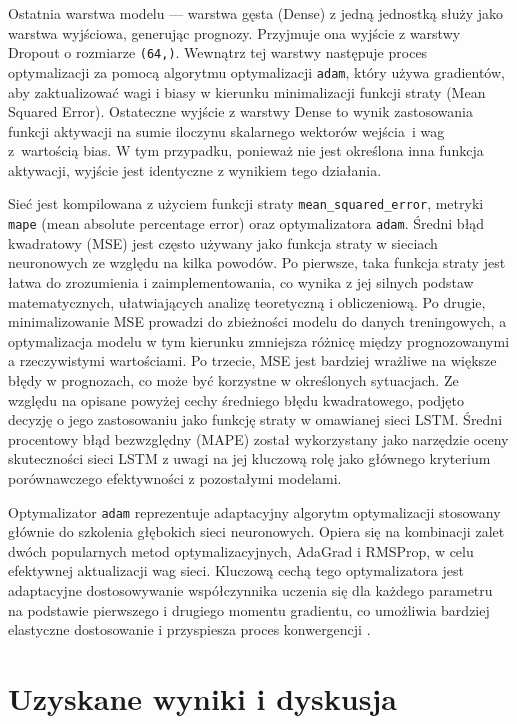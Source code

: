 \documentclass[polish, twoside, 12pt, a4paper]{article}
\theoremstyle{definition}
\theoremstyle{plain}
\theoremstyle{remark}
\newcommand{\code}[1]{\lstinline{#1}}
\begin{document}
Ostatnia warstwa modelu --- warstwa gęsta (Dense) z jedną jednostką służy jako warstwa wyjściowa, generując prognozy. Przyjmuje ona wyjście z warstwy Dropout o rozmiarze \code{(64,)}. Wewnątrz tej warstwy następuje proces optymalizacji za pomocą algorytmu optymalizacji \code{adam}, który używa gradientów, aby zaktualizować wagi i biasy w kierunku minimalizacji funkcji straty (Mean Squared Error). Ostateczne wyjście z warstwy Dense to wynik zastosowania funkcji aktywacji na sumie iloczynu skalarnego wektorów wejścia i wag z wartością bias. W tym przypadku, ponieważ nie jest określona inna funkcja aktywacji, wyjście jest identyczne z wynikiem tego działania.

Sieć jest kompilowana z użyciem funkcji straty \code{mean_squared_error}, metryki \code{mape} (mean absolute percentage error) oraz optymalizatora \code{adam}. Średni błąd kwadratowy (MSE) jest często używany jako funkcja straty w sieciach neuronowych ze względu na kilka powodów. Po pierwsze, taka funkcja straty jest łatwa do zrozumienia i zaimplementowania, co wynika z jej silnych podstaw matematycznych, ułatwiających analizę teoretyczną i obliczeniową. Po drugie, minimalizowanie MSE prowadzi do zbieżności modelu do danych treningowych, a optymalizacja modelu w tym kierunku zmniejsza różnicę między prognozowanymi a rzeczywistymi wartościami. Po trzecie, MSE jest bardziej wrażliwe na większe błędy w prognozach, co może być korzystne w określonych sytuacjach. Ze względu na opisane powyżej cechy średniego błędu kwadratowego, podjęto decyzję o jego zastosowaniu jako funkcję straty w omawianej sieci LSTM. Średni procentowy błąd bezwzględny (MAPE) został wykorzystany jako narzędzie oceny skuteczności sieci LSTM z uwagi na jej kluczową rolę jako głównego kryterium porównawczego efektywności z pozostałymi modelami.

Optymalizator \code{adam} reprezentuje adaptacyjny algorytm optymalizacji stosowany głównie do szkolenia głębokich sieci neuronowych. Opiera się na kombinacji zalet dwóch popularnych metod optymalizacyjnych, AdaGrad i RMSProp, w celu efektywnej aktualizacji wag sieci. Kluczową cechą tego optymalizatora jest adaptacyjne dostosowywanie współczynnika uczenia się dla każdego parametru na podstawie pierwszego i drugiego momentu gradientu, co umożliwia bardziej elastyczne dostosowanie i przyspiesza proces konwergencji \citep{frackiewicz2023}.


\clearpage
\section{Uzyskane wyniki i dyskusja}\label{sec:wyniki}
\end{document}
